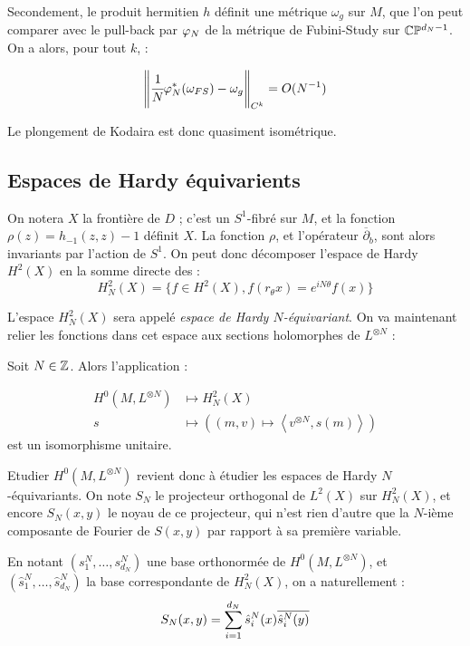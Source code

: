 Secondement, le produit hermitien $h$ définit une métrique $\omega_g$ sur $M$, que l'on peut comparer avec le pull-back par $\varphi_N$ de la métrique de Fubini-Study sur $\mathbb{C}\mathbb{P}^{d_N-1}$. On a alors, pour tout $k$, :

\begin{corr}\begin{equation*}
\left\|\cfrac1N \varphi_N^*(\omega_{FS}) - \omega_g \right\|_{C^{k}} = O(N^{-1})
\end{equation*}\end{corr}

Le plongement de Kodaira est donc quasiment isométrique.

\subsection{Espaces de Hardy équivarients}

On notera $X$ la frontière de $D$ ; c'est un $S^1$-fibré sur $M$, et la fonction $\rho(z)=h_{-1}(z,z)-1$ définit $X$. La fonction $\rho$, et l'opérateur $\overline{\partial}_b$, sont alors invariants par l'action de $S^1$. On peut donc décomposer l'espace de Hardy $H^2(X)$ en la somme directe des :
\begin{equation*}
	H^2_N(X)=\{f \in H^2(X), f(r_{\theta}x) = e^{iN\theta}f(x)\}
\end{equation*}

L'espace $H^2_N(X)$ sera appelé \emph{espace de Hardy $N$-équivariant}. On va maintenant relier les fonctions dans cet espace aux sections holomorphes de $L^{\otimes N}$ :

\begin{prop} Soit $N \in \mathbb{Z}$. Alors l'application :

\begin{align*}
	H^0(M,L^{\otimes N}) &\mapsto H^2_N(X) \\
	s &\mapsto \left((m,v) \mapsto \left\langle v^{\otimes N}, s(m)\right\rangle \right)
\end{align*}
est un isomorphisme unitaire.
\end{prop}

Etudier $H^0(M,L^{\otimes N})$ revient donc à étudier les espaces de Hardy $N$-équivariants. On note $S_N$ le projecteur orthogonal de $L^2(X)$ sur $H^2_N(X)$, et encore $S_N(x,y)$ le noyau de ce projecteur, qui n'est rien d'autre que la $N$-ième composante de Fourier de $S(x,y)$ par rapport à sa première variable.

En notant $(s^N_1, \ldots, s^N_{d_N})$ une base orthonormée de $H^0(M,L^{\otimes N})$, et $(\hat{s}^N_1, \ldots, \hat{s}^N_{d_N})$ la base correspondante de $H^2_N(X)$, on a naturellement :
\begin{equation*}
	S_N(x,y)=\sum_{i=1}^{d_N}\hat{s}^N_i(x) \overline{\hat{s}^N_i(y)\strut}
\end{equation*}

